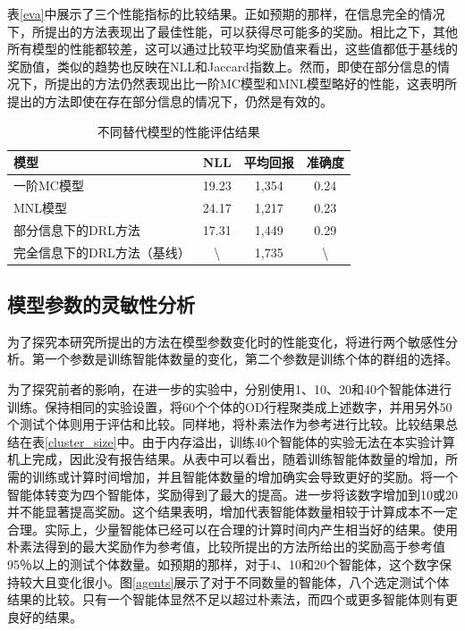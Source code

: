 表\ref{eva}中展示了三个性能指标的比较结果。正如预期的那样，在信息完全的情况下，所提出的方法表现出了最佳性能，可以获得尽可能多的奖励。相比之下，其他所有模型的性能都较差，这可以通过比较平均奖励值来看出，这些值都低于基线的奖励值，类似的趋势也反映在NLL和Jaccard指数上。然而，即使在部分信息的情况下，所提出的方法仍然表现出比一阶MC模型和MNL模型略好的性能，这表明所提出的方法即使在存在部分信息的情况下，仍然是有效的。

\begin{table}[htbp]
\centering
\caption{不同替代模型的性能评估结果}
\label{tab:eva}
\renewcommand{\arraystretch}{1.2} %
\setlength{\tabcolsep}{8mm} %
\small %

\begin{tabular}{lccc}
\toprule
模型 & NLL & 平均回报 & 准确度 \\
\midrule
一阶MC模型 & 19.23 & 1,354 & 0.24 \\
MNL模型 & 24.17 & 1,217 & 0.23 \\
部分信息下的DRL方法 & 17.31 & 1,449 & 0.29 \\
完全信息下的DRL方法（基线） & \textbackslash{} & 1,735 & \textbackslash{} \\
\bottomrule
\end{tabular}
\end{table}

\subsection{模型参数的灵敏性分析}

为了探究本研究所提出的方法在模型参数变化时的性能变化，将进行两个敏感性分析。第一个参数是训练智能体数量的变化，第二个参数是训练个体的群组的选择。

为了探究前者的影响，在进一步的实验中，分别使用1、10、20和40个智能体进行训练。保持相同的实验设置，将60个个体的OD行程聚类成上述数字，并用另外50个测试个体则用于评估和比较。同样地，将朴素法作为参考进行比较。比较结果总结在表\ref{cluster_size}中。由于内存溢出，训练40个智能体的实验无法在本实验计算机上完成，因此没有报告结果。从表中可以看出，随着训练智能体数量的增加，所需的训练或计算时间增加，并且智能体数量的增加确实会导致更好的奖励。将一个智能体转变为四个智能体，奖励得到了最大的提高。进一步将该数字增加到10或20并不能显著提高奖励。这个结果表明，增加代表智能体数量相较于计算成本不一定合理。实际上，少量智能体已经可以在合理的计算时间内产生相当好的结果。使用朴素法得到的最大奖励作为参考值，比较所提出的方法所给出的奖励高于参考值95％以上的测试个体数量。如预期的那样，对于4、10和20个智能体，这个数字保持较大且变化很小。图\ref{agents}展示了对于不同数量的智能体，八个选定测试个体结果的比较。只有一个智能体显然不足以超过朴素法，而四个或更多智能体则有更良好的结果。

